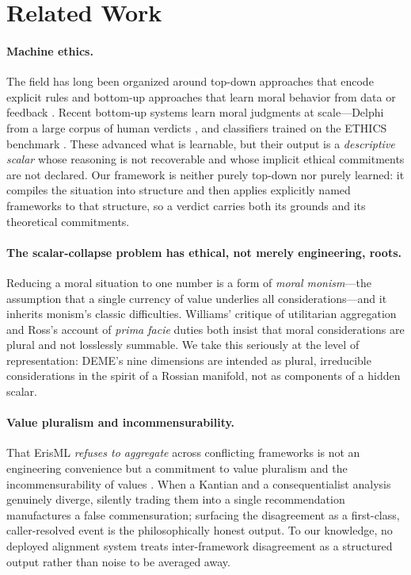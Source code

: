 \section{Related Work}
\label{sec:related}

\paragraph{Machine ethics.}
The field has long been organized around top-down approaches that encode explicit rules
and bottom-up approaches that learn moral behavior from data or feedback
\citep{wallach2009moral,anderson2011machine}. Recent bottom-up systems learn moral
judgments at scale---Delphi from a large corpus of human verdicts \citep{jiang2021delphi},
and classifiers trained on the ETHICS benchmark \citep{hendrycks2021ethics}. These advanced
what is learnable, but their output is a \emph{descriptive scalar} whose reasoning is not
recoverable and whose implicit ethical commitments are not declared. Our framework is
neither purely top-down nor purely learned: it compiles the situation into structure and
then applies explicitly named frameworks to that structure, so a verdict carries both its
grounds and its theoretical commitments.

\paragraph{The scalar-collapse problem has ethical, not merely engineering, roots.}
Reducing a moral situation to one number is a form of \emph{moral monism}---the assumption
that a single currency of value underlies all considerations---and it inherits monism's
classic difficulties. Williams' critique of utilitarian aggregation \citep{williams1973}
and Ross's account of \emph{prima facie} duties \citep{ross1930} both insist that moral
considerations are plural and not losslessly summable. We take this seriously at the level
of representation: DEME's nine dimensions are intended as plural, irreducible considerations
in the spirit of a Rossian manifold, not as components of a hidden scalar.

\paragraph{Value pluralism and incommensurability.}
That ErisML \emph{refuses to aggregate} across conflicting frameworks is not an engineering
convenience but a commitment to value pluralism and the incommensurability of values
\citep{berlin1969,williams1981,chang1997}. When a Kantian and a consequentialist analysis
genuinely diverge, silently trading them into a single recommendation manufactures a false
commensuration; surfacing the disagreement as a first-class, caller-resolved event is the
philosophically honest output. To our knowledge, no deployed alignment system treats
inter-framework disagreement as a structured output rather than noise to be averaged away.

